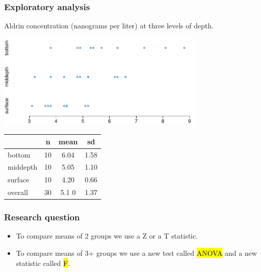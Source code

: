 \documentclass[notes,11pt, aspectratio=169]{beamer}
\begin{document}
\begin{frame}
\frametitle{Exploratory analysis}

Aldrin concentration (nanograms per liter) at three levels of depth. \\

\begin{center}
\includegraphics[width=0.75\textwidth]{graphs/dotplot}
\end{center}

\begin{center}
\begin{tabular}{l | c c c}
		& n	& mean	& sd		\\
\hline
bottom	& 10	& 6.04	& 1.58 \\
middepth& 10	& 5.05	& 1.10 \\
surface	& 10	& 4.20	& 0.66 \\
\hline
overall	& 30	& 5.1	0	& 1.37
\end{tabular}
\end{center}

\end{frame}


\begin{frame}
\frametitle{Research question}


\vspace{0.5cm}

\pause

\begin{itemize}

\item To compare means of 2 groups we use a Z or a T statistic.

\pause

\item To compare means of 3+ groups we use a new test called \hl{ANOVA} and a new statistic called \hl{F}.

\end{itemize}

\end{frame}
\end{document}
